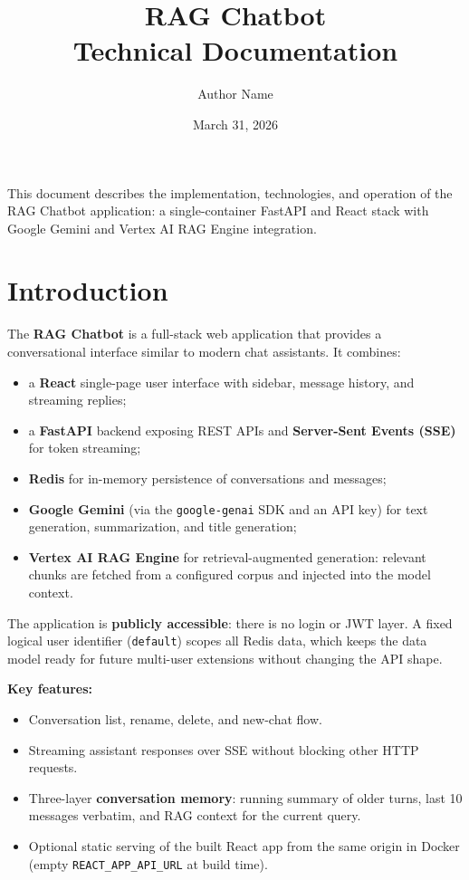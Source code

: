 \documentclass[11pt,a4paper]{article}
\title{RAG Chatbot\\[0.5em]\large Technical Documentation}
\author{Author Name}
\date{March 31, 2026}
\begin{document}
\maketitle
\thispagestyle{empty}
\vfill
\begin{center}
\small
This document describes the implementation, technologies, and operation of the RAG Chatbot application: a single-container FastAPI and React stack with Google Gemini and Vertex AI RAG Engine integration.
\end{center}
\vfill
\clearpage

\tableofcontents
\clearpage

\section{Introduction}

The \textbf{RAG Chatbot} is a full-stack web application that provides a conversational interface similar to modern chat assistants. It combines:

\begin{itemize}[noitemsep]
  \item a \textbf{React} single-page user interface with sidebar, message history, and streaming replies;
  \item a \textbf{FastAPI} backend exposing REST APIs and \textbf{Server-Sent Events (SSE)} for token streaming;
  \item \textbf{Redis} for in-memory persistence of conversations and messages;
  \item \textbf{Google Gemini} (via the \texttt{google-genai} SDK and an API key) for text generation, summarization, and title generation;
  \item \textbf{Vertex AI RAG Engine} for retrieval-augmented generation: relevant chunks are fetched from a configured corpus and injected into the model context.
\end{itemize}

The application is \textbf{publicly accessible}: there is no login or JWT layer. A fixed logical user identifier (\texttt{default}) scopes all Redis data, which keeps the data model ready for future multi-user extensions without changing the API shape.

\textbf{Key features:}
\begin{itemize}[noitemsep]
  \item Conversation list, rename, delete, and new-chat flow.
  \item Streaming assistant responses over SSE without blocking other HTTP requests.
  \item Three-layer \textbf{conversation memory}: running summary of older turns, last 10 messages verbatim, and RAG context for the current query.
  \item Optional static serving of the built React app from the same origin in Docker (empty \texttt{REACT\_APP\_API\_URL} at build time).
\end{itemize}
\end{document}
